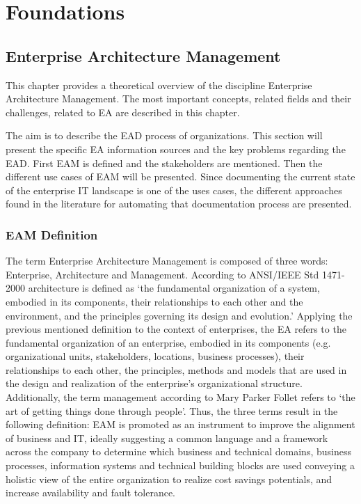 
\chapter{Foundations}\label{chapter:foundations}
\section{Enterprise Architecture Management} 

This chapter provides a theoretical overview of the discipline Enterprise Architecture Management. The most important concepts, related fields and their challenges, related to EA are described in this chapter.

The aim is to describe the EAD process of organizations. This section will present the specific EA information sources and the key problems regarding the EAD. First EAM is defined and the stakeholders are mentioned. Then the different use cases of EAM will be presented. Since documenting the current state of the enterprise IT landscape is one of the uses cases, the different approaches found in the literature for automating that documentation process are presented.


\subsection{EAM Definition}
The term Enterprise Architecture Management is composed of three words: Enterprise, Architecture and Management.
According to ANSI/IEEE Std 1471-2000 architecture is defined as ‘the fundamental organization of a system, embodied in its components, their relationships to each other and the environment, and the principles governing its design and evolution.’
Applying the previous mentioned definition to the context of enterprises, the EA refers to the fundamental organization of an enterprise, embodied in its components (e.g. organizational units, stakeholders, locations, business processes), their relationships to each other, the principles, methods and models that are used in the design and realization of the enterprise’s organizational structure. \cite{Buckl2009}
Additionally, the term management according to Mary Parker Follet refers to ‘the art of getting things done through people’. \cite{Buckl2009a}\cite{Buckl2009}\cite{Jonkers2006}\cite{VanAken2005}
Thus, the three terms result in the following definition: EAM is promoted as an instrument to improve the alignment of business and IT, ideally suggesting a common language and a framework across the company to determine  which business and technical domains, business processes, information systems and technical building blocks are used conveying a holistic view of the entire organization to realize cost savings potentials, and increase availability and fault tolerance. \cite{Hauder2012}

